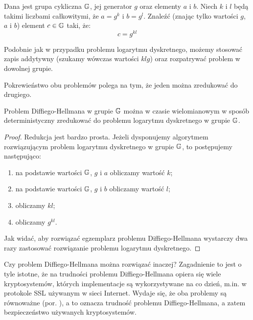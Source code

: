 \begin{problem}
Dana jest grupa cykliczna $\mathbb{G}$,
jej generator $g$
oraz elementy $a$ i $b$.
Niech $k$ i $l$ będą takimi liczbami całkowitymi,
że $a = g^k$ i $b = g^l$.
Znaleźć (znając tylko wartości $g$, $a$ i $b$)
element $c \in \mathbb{G}$ taki, że:
\begin{equation}
c = g^{kl}
\end{equation}
\end{problem}

\begin{remark}
Podobnie jak w przypadku problemu logarytmu dyskretnego,
możemy stosować zapis addytywny (szukamy wówczas wartości $klg$)
oraz rozpatrywać problem w dowolnej grupie.
\end{remark}

\noindent
Pokrewieństwo obu problemów polega na tym,
że jeden można zredukować do drugiego.

\begin{theorem}
Problem Diffiego-Hellmana w grupie $\mathbb{G}$ można
w czasie wielomianowym w sposób deterministyczny
zredukować do problemu logarytmu dyskretnego w grupie $\mathbb{G}$.
\end{theorem}

\begin{proof}
Redukcja jest bardzo prosta.
Jeżeli dysponujemy algorytmem rozwiązującym
problem logarytmu dyskretnego w grupie $\mathbb{G}$,
to postępujemy następująco:
\begin{enumerate}
\item na podstawie wartości $\mathbb{G}$, $g$ i $a$ obliczamy wartość $k$;
\item na podstawie wartości $\mathbb{G}$, $g$ i $b$ obliczamy wartość $l$;
\item obliczamy $kl$;
\item obliczamy $g^{kl}$.
\end{enumerate}
Jak widać, aby rozwiązać egzemplarz problemu Diffiego-Hellmana
wystarczy dwa razy zastosować rozwiązanie problemu logarytmu dyskretnego.
\end{proof}

\noindent
Czy problem Diffiego-Hellmana można rozwiązać inaczej?
Zagadnienie to jest o tyle istotne,
że na trudności problemu Diffiego-Hellmana
opiera się wiele kryptosystemów,
których implementacje są wykorzystywane na co dzień,
m.in. w protokole SSL używanym w sieci Internet.
Wydaje się, że oba problemy są równoważne (por. \cite{maurer}),
a to oznacza trudność problemu Diffiego-Hellmana,
a zatem bezpieczeństwo używanych kryptosystemów.


